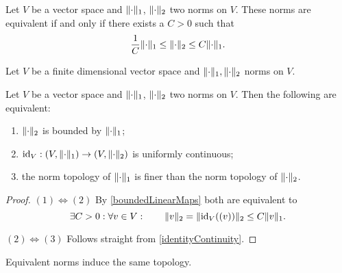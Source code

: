 \begin{lemma}
Let $V$ be a vector space and $\lVert\cdot\rVert_1$, $\lVert\cdot\rVert_2$ two norms on $V$. These norms are equivalent \textup{if and only if} there exists a $C>0$ such that
\[ \frac{1}{C}\lVert\cdot\rVert_1 \leq \lVert\cdot\rVert_2 \leq C\lVert\cdot\rVert_1. \]
\end{lemma}

\begin{lemma}
Let $V$ be a finite dimensional vector space and $\lVert\cdot\rVert_1, \lVert\cdot\rVert_2$ norms on $V$. 
\end{lemma}

\begin{proposition} \label{normComparison}
Let $V$ be a vector space and $\lVert\cdot\rVert_1$, $\lVert\cdot\rVert_2$ two norms on $V$. Then the following are equivalent:
\begin{enumerate}
\item $\lVert\cdot\rVert_2$ is bounded by $\lVert\cdot\rVert_1$;
\item $\id_V: \sSet{V,\norm{\cdot}_1} \to \sSet{V,\norm{\cdot}_2}$ is uniformly continuous;
\item the norm topology of $\lVert\cdot\rVert_1$ is finer than the norm topology of $\lVert\cdot\rVert_2$.
\end{enumerate}
\end{proposition}
\begin{proof}
$(1) \Leftrightarrow (2)$ By \ref{boundedLinearMaps} both are equivalent to
\[ \exists C>0: \forall v\in V: \qquad \lVert v\rVert_2 = \lVert\operatorname{id}_V((v))\rVert_2 \leq C\lVert v\rVert_1. \]

$(2) \Leftrightarrow (3)$ Follows straight from \ref{identityContinuity}.
\end{proof}
\begin{corollary}
Equivalent norms induce the same topology.
\end{corollary}

